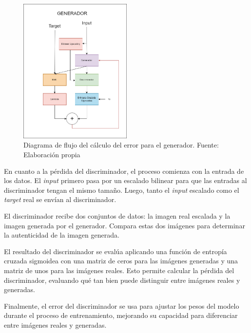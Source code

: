 \begin{figure}[H]
	\centering
	\includegraphics[width=0.5\textwidth]{figures/losses_GAN_Generador.png}
	\caption{\label{fig:gangenloss}Diagrama de flujo del cálculo del error para el generador. Fuente: Elaboración propia}
\end{figure}

En cuanto a la pérdida del discriminador, el proceso comienza con la entrada de los datos. El \textit{input} primero pasa por un escalado bilinear para que las entradas al discriminador tengan el mismo tamaño. Luego, tanto el \textit{input} escalado como el \textit{target} real se envían al discriminador.

El discriminador recibe dos conjuntos de datos: la imagen real escalada y la imagen generada por el generador. Compara estas dos imágenes para determinar la autenticidad de la imagen generada.

El resultado del discriminador se evalúa aplicando una función de entropía cruzada sigmoidea con una matriz de ceros para las imágenes generadas y una matriz de unos para las imágenes reales. Esto permite calcular la pérdida del discriminador, evaluando qué tan bien puede distinguir entre imágenes reales y generadas.

Finalmente, el error del discriminador se usa para ajustar los pesos del modelo durante el proceso de entrenamiento, mejorando su capacidad para diferenciar entre imágenes reales y generadas.

